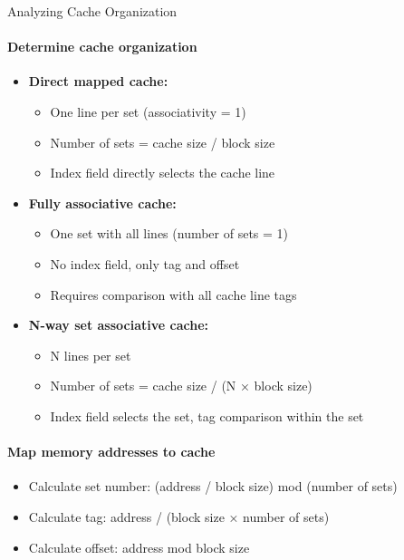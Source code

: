 \begin{KR}{Analyzing Cache Organization}
\paragraph{Determine cache organization}
\begin{itemize}
    \item \textbf{Direct mapped cache:}
    \begin{itemize}
        \item One line per set (associativity = 1)
        \item Number of sets = cache size / block size
        \item Index field directly selects the cache line
    \end{itemize}
    \item \textbf{Fully associative cache:}
    \begin{itemize}
        \item One set with all lines (number of sets = 1)
        \item No index field, only tag and offset
        \item Requires comparison with all cache line tags
    \end{itemize}
    \item \textbf{N-way set associative cache:}
    \begin{itemize}
        \item N lines per set
        \item Number of sets = cache size / (N × block size)
        \item Index field selects the set, tag comparison within the set
    \end{itemize}
\end{itemize}

\paragraph{Map memory addresses to cache}
\begin{itemize}
    \item Calculate set number: (address / block size) mod (number of sets)
    \item Calculate tag: address / (block size × number of sets)
    \item Calculate offset: address mod block size
\end{itemize}
\end{KR}

